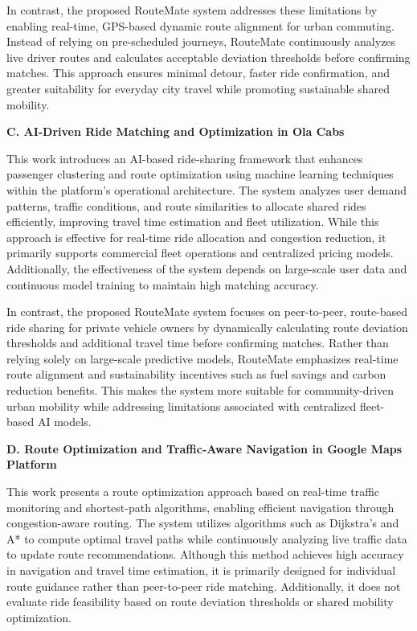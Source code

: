 \documentclass[conference]{IEEEtran}
\begin{document}
In contrast, the proposed RouteMate system addresses these limitations by enabling real-time, GPS-based dynamic route alignment for urban commuting. Instead of relying on pre-scheduled journeys, RouteMate continuously analyzes live driver routes and calculates acceptable deviation thresholds before confirming matches. This approach ensures minimal detour, faster ride confirmation, and greater suitability for everyday city travel while promoting sustainable shared mobility.

\vspace{4pt}
\textbf{C. AI-Driven Ride Matching and Optimization in Ola Cabs}

\vspace{2pt}
This work introduces an AI-based ride-sharing framework that enhances passenger clustering and route optimization using machine learning techniques within the platform’s operational architecture. The system analyzes user demand patterns, traffic conditions, and route similarities to allocate shared rides efficiently, improving travel time estimation and fleet utilization. While this approach is effective for real-time ride allocation and congestion reduction, it primarily supports commercial fleet operations and centralized pricing models. Additionally, the effectiveness of the system depends on large-scale user data and continuous model training to maintain high matching accuracy.

In contrast, the proposed RouteMate system focuses on peer-to-peer, route-based ride sharing for private vehicle owners by dynamically calculating route deviation thresholds and additional travel time before confirming matches. Rather than relying solely on large-scale predictive models, RouteMate emphasizes real-time route alignment and sustainability incentives such as fuel savings and carbon reduction benefits. This makes the system more suitable for community-driven urban mobility while addressing limitations associated with centralized fleet-based AI models.

\vspace{4pt}
\textbf{D. Route Optimization and Traffic-Aware Navigation in Google Maps Platform}

\vspace{2pt}
This work presents a route optimization approach based on real-time traffic monitoring and shortest-path algorithms, enabling efficient navigation through congestion-aware routing. The system utilizes algorithms such as Dijkstra’s and A* to compute optimal travel paths while continuously analyzing live traffic data to update route recommendations. Although this method achieves high accuracy in navigation and travel time estimation, it is primarily designed for individual route guidance rather than peer-to-peer ride matching. Additionally, it does not evaluate ride feasibility based on route deviation thresholds or shared mobility optimization.
\end{document}
